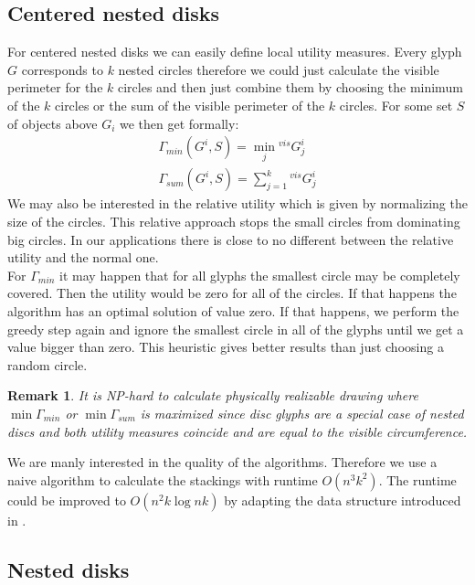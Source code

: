 \documentclass[a4paper,11pt]{article}
\newtheorem*{remark}{Remark}
\begin{document}
\subsection{Centered nested disks}
For centered nested disks we can easily define local utility measures. Every glyph $G$ corresponds to $k$ nested circles therefore we could just calculate the visible perimeter for the $k$ circles and then just combine them by choosing the minimum of the $k$ circles or the sum of the visible perimeter of the $k$ circles. For some set $S$ of objects above $G_i$ we then get formally:
\begin{align*}
  \Gamma_{min}({G^i,S})=\min_j  {^{vis} G^i_j} \\
  \Gamma_{sum}({G^i,S})=\sum_{j=1}^k  {^{vis} G^i_j}
\end{align*}
We may also be interested in the relative utility which is given by normalizing the size of the circles. This relative approach stops the small circles from dominating big circles. In our applications there is close to no different between the relative utility and the normal one. \\

For $\Gamma_{min}$ it may happen that for all glyphs the smallest circle may be completely covered. Then the utility would be zero for all of the circles. If that happens the algorithm has an optimal solution of value zero. If that happens, we perform the greedy step again and ignore the smallest circle in all of the glyphs until we get a value bigger than zero. This heuristic gives better results than just choosing a random circle.\\
%
\begin{remark}
It is NP-hard to calculate physically realizable drawing where $\min\Gamma_{min}$ or $\min\Gamma_{sum}$ is maximized since disc glyphs are a special case of nested discs and both utility measures coincide and are equal to the visible circumference.
\end{remark}
We are manly interested in the quality of the algorithms. Therefore we use a naive algorithm to calculate the stackings with runtime $O(n^3k^2)$. The runtime could be improved to $O(n^2k \log nk)$ by adapting the data structure introduced in \cite{caballo}.


\subsection{Nested disks}
\end{document}
